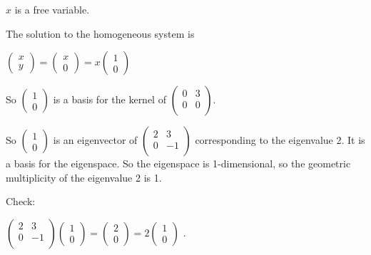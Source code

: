 \documentclass[oneside,12pt]{amsart}
\begin{document}
$x$ is a free variable.

\bigskip

The solution to the homogeneous system is

\bigskip


$
\begin{pmatrix}
x \\ y
\end{pmatrix}
=
\begin{pmatrix}
x \\ 0
\end{pmatrix}
=
x
\begin{pmatrix}
1 \\ 0
\end{pmatrix}
$

\bigskip

So
$
\begin{pmatrix}
1 \\ 0
\end{pmatrix}
$
is a basis for the kernel of
$
\begin{pmatrix}
0 & 3 \\
0 & 0 \\
\end{pmatrix}
$.

\bigskip


So
$
\begin{pmatrix}
1 \\ 0
\end{pmatrix}
$
is an eigenvector of
$
\begin{pmatrix}
2 & 3 \\
0 & -1 \\
\end{pmatrix}
$
corresponding to the eigenvalue 2. It is a basis for the eigenspace.
So the eigenspace is 1-dimensional, so the geometric
multiplicity of the eigenvalue 2 is 1.

\bigskip

Check:

\bigskip

$
\begin{pmatrix}
2 & 3 \\
0 & -1 \\
\end{pmatrix}
\begin{pmatrix}
1 \\ 0
\end{pmatrix}
=
\begin{pmatrix}
2 \\ 0
\end{pmatrix}
=
2
\begin{pmatrix}
1 \\ 0
\end{pmatrix}
$
.
\end{document}

